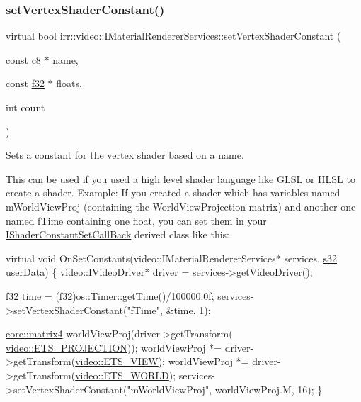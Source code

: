 \subsubsection{\texorpdfstring{set\+Vertex\+Shader\+Constant()}{setVertexShaderConstant()}\hspace{0.1cm}{\footnotesize\ttfamily [1/4]}}
{\footnotesize\ttfamily virtual bool irr\+::video\+::\+I\+Material\+Renderer\+Services\+::set\+Vertex\+Shader\+Constant (\begin{DoxyParamCaption}\item[{const \hyperlink{namespaceirr_a9395eaea339bcb546b319e9c96bf7410}{c8} $\ast$}]{name,  }\item[{const \hyperlink{namespaceirr_a0277be98d67dc26ff93b1a6a1d086b07}{f32} $\ast$}]{floats,  }\item[{int}]{count }\end{DoxyParamCaption})\hspace{0.3cm}{\ttfamily [pure virtual]}}



Sets a constant for the vertex shader based on a name. 

This can be used if you used a high level shader language like G\+L\+SL or H\+L\+SL to create a shader. Example\+: If you created a shader which has variables named \textquotesingle{}m\+World\+View\+Proj\textquotesingle{} (containing the World\+View\+Projection matrix) and another one named \textquotesingle{}f\+Time\textquotesingle{} containing one float, you can set them in your \hyperlink{classirr_1_1video_1_1IShaderConstantSetCallBack}{I\+Shader\+Constant\+Set\+Call\+Back} derived class like this\+: 
\begin{DoxyCode}
\textcolor{keyword}{virtual} \textcolor{keywordtype}{void} OnSetConstants(video::IMaterialRendererServices* services, \hyperlink{namespaceirr_ac66849b7a6ed16e30ebede579f9b47c6}{s32} userData)
\{
    video::IVideoDriver* driver = services->getVideoDriver();

    \hyperlink{namespaceirr_a0277be98d67dc26ff93b1a6a1d086b07}{f32} time = (\hyperlink{namespaceirr_a0277be98d67dc26ff93b1a6a1d086b07}{f32})os::Timer::getTime()/100000.0f;
    services->setVertexShaderConstant(\textcolor{stringliteral}{"fTime"}, &time, 1);

    \hyperlink{namespaceirr_1_1core_a4c9d4e29899535971052810954a14431}{core::matrix4} worldViewProj(driver->getTransform(
      \hyperlink{namespaceirr_1_1video_a15b57657a320243be03ae6f66fcff43da3e02dc0a1b7e92ea9ff2a548d54e10cc}{video::ETS\_PROJECTION}));
    worldViewProj *= driver->getTransform(\hyperlink{namespaceirr_1_1video_a15b57657a320243be03ae6f66fcff43da9f4c5ade2cd956ef9dcc658fd8df2183}{video::ETS\_VIEW});
    worldViewProj *= driver->getTransform(\hyperlink{namespaceirr_1_1video_a15b57657a320243be03ae6f66fcff43daf0d9765331daace35b8443c471738305}{video::ETS\_WORLD});
    services->setVertexShaderConstant(\textcolor{stringliteral}{"mWorldViewProj"}, worldViewProj.M, 16);
\}
\end{DoxyCode}
 
